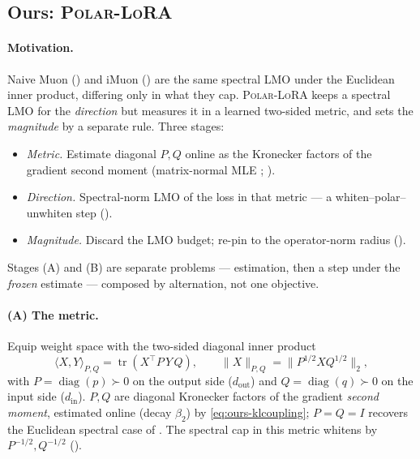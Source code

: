 \documentclass[11pt]{article}
\DeclareMathOperator{\diag}{diag}
\newcommand{\methodname}{\textsc{Polar-LoRA}\xspace}
\theoremstyle{plain}
\theoremstyle{definition}
\theoremstyle{remark}
\begin{document}
\subsection{Ours: \methodname}
\label{sec:method-ours}
\paragraph{Motivation.} Naive Muon () and iMuon () are the same spectral LMO under the Euclidean inner product, differing only in what they cap. \methodname{} keeps a spectral LMO for the \emph{direction} but measures it in a learned two-sided metric, and sets the \emph{magnitude} by a separate rule. Three stages:
\begin{itemize}[leftmargin=1.7em,itemsep=1pt,topsep=2pt]
  \item[(A)] \emph{Metric.} Estimate diagonal $P,Q$ online as the Kronecker factors of the gradient second moment (matrix-normal MLE \cite{klshampoo}; ).
  \item[(B)] \emph{Direction.} Spectral-norm LMO of the loss in that metric --- a whiten--polar--unwhiten step ().
  \item[(C)] \emph{Magnitude.} Discard the LMO budget; re-pin to the operator-norm radius ().
\end{itemize}
Stages (A) and (B) are separate problems --- estimation, then a step under the \emph{frozen} estimate --- composed by alternation, not one objective.

\paragraph{(A) The metric.} Equip weight space with the two-sided diagonal inner product
\begin{equation}
  \langle X,Y\rangle_{P,Q}=\operatorname{tr}(X^\top P\,Y\,Q),\qquad
  \|X\|_{P,Q}=\|P^{1/2}XQ^{1/2}\|_2,
  \label{eq:ours-metric}
\end{equation}
with $P=\diag(p)\succ0$ on the output side ($d_{\mathrm{out}}$) and $Q=\diag(q)\succ0$ on the input side ($d_{\mathrm{in}}$). $P,Q$ are diagonal Kronecker factors of the gradient \emph{second moment}, estimated online (decay $\beta_2$) by \eqref{eq:ours-klcoupling}; $P=Q=I$ recovers the Euclidean spectral case of . The spectral cap in this metric whitens by $P^{-1/2},Q^{-1/2}$ ().
\end{document}
